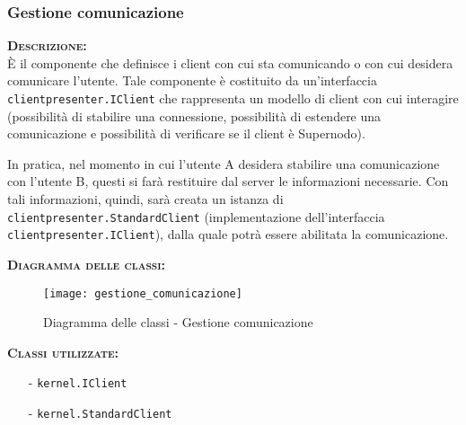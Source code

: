 \subsubsection{Gestione comunicazione}
\begin{description}
	\item{\scshape\bfseries Descrizione:}\\
È il componente che definisce i client con cui sta comunicando o con cui desidera comunicare l'utente. Tale componente è costituito da un'interfaccia \texttt{clientpresenter.IClient} che rappresenta un modello di client con cui interagire (possibilità di stabilire una connessione, possibilità di estendere una comunicazione e possibilità di verificare se il client è Supernodo).

In pratica, nel momento in cui l'utente A desidera stabilire una comunicazione con l'utente B, questi si farà restituire dal server le informazioni necessarie. Con tali informazioni, quindi, sarà creata un istanza di \texttt{clientpresenter.StandardClient} (implementazione dell'interfaccia \texttt{clientpresenter.IClient}), dalla quale potrà essere abilitata la comunicazione.
	\item{\scshape\bfseries Diagramma delle classi:}
	\begin{figure}[H]
\begin{center}
\texttt{[image: gestione\_comunicazione]}
\caption{Diagramma delle classi - Gestione comunicazione}\label{fig:gestione_comunicazione}
\end{center}
\end{figure}
	\item{\scshape\bfseries Classi utilizzate:} 
	\begin{itemize}[noitemsep,nolistsep]
		\item[-] \texttt{kernel.IClient}
		\item[-] \texttt{kernel.StandardClient}
	\end{itemize}  
\end{description}

